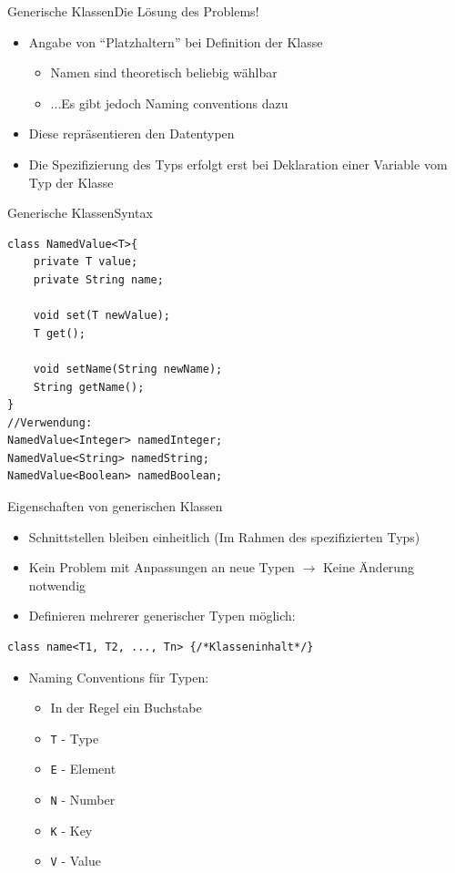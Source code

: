 \begin{frame}{Generische Klassen}{Die Lösung des Problems!}
    \begin{itemize}
        \item Angabe von "`Platzhaltern"' bei Definition der Klasse
        \begin{itemize}
            \item Namen sind theoretisch beliebig wählbar
            \item ...Es gibt jedoch Naming conventions dazu
        \end{itemize}
        \item Diese repräsentieren den Datentypen
        \item Die Spezifizierung des Typs erfolgt erst bei Deklaration einer Variable vom Typ der Klasse
    \end{itemize}
\end{frame}

\begin{frame}[fragile]{Generische Klassen}{Syntax}
\lstset{style=java}
\begin{lstlisting}
class NamedValue<T>{
    private T value;
    private String name;
    
    void set(T newValue);
    T get();
    
    void setName(String newName);
    String getName();
}
//Verwendung:
NamedValue<Integer> namedInteger;
NamedValue<String> namedString;
NamedValue<Boolean> namedBoolean;
\end{lstlisting}
\end{frame}

\begin{frame}{Eigenschaften von generischen Klassen}
\begin{itemize}
    \item Schnittstellen bleiben einheitlich (Im Rahmen des spezifizierten Typs)
    \item Kein Problem mit Anpassungen an neue Typen $\rightarrow$ Keine Änderung notwendig
    \item Definieren mehrerer generischer Typen möglich:
\end{itemize}%
\lstset{style=java}%
\begin{lstlisting}
class name<T1, T2, ..., Tn> {/*Klasseninhalt*/}
\end{lstlisting}
\framebreak
\begin{itemize}
\item Naming Conventions für Typen:
    \begin{itemize}
        \item In der Regel ein Buchstabe
        \item \texttt{T} - Type
        \item \texttt{E} - Element
        \item \texttt{N} - Number
        \item \texttt{K} - Key
        \item \texttt{V} - Value
    \end{itemize}
\end{itemize}
\end{frame}

